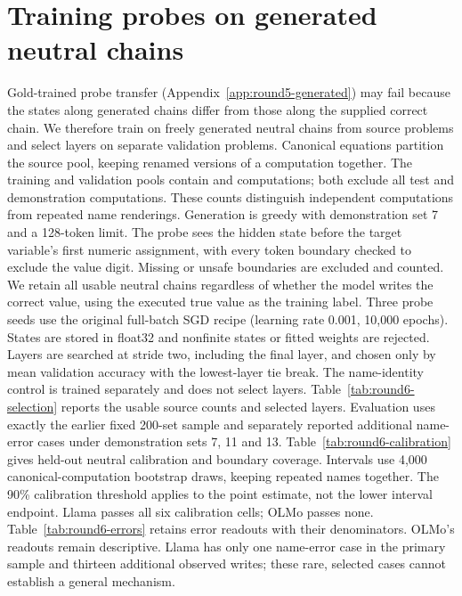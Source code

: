 \newsavebox{\roundsixbox}
\section{Training probes on generated neutral chains}
\label{app:round6-generated}
Gold-trained probe transfer (Appendix~\ref{app:round5-generated}) may fail because the states along generated chains differ from those along the supplied correct chain. We therefore train on freely generated neutral chains from  source problems and select layers on  separate validation problems. Canonical equations partition the source pool, keeping renamed versions of a computation together. The training and validation pools contain  and  computations; both exclude all test and demonstration computations. These counts distinguish independent computations from repeated name renderings.
Generation is greedy with demonstration set 7 and a 128-token limit. The probe sees the hidden state before the target variable's first numeric assignment, with every token boundary checked to exclude the value digit. Missing or unsafe boundaries are excluded and counted. We retain all usable neutral chains regardless of whether the model writes the correct value, using the executed true value as the training label. Three probe seeds use the original full-batch SGD recipe (learning rate 0.001, 10,000 epochs). States are stored in float32 and nonfinite states or fitted weights are rejected. Layers are searched at stride two, including the final layer, and chosen only by mean validation accuracy with the lowest-layer tie break. The name-identity control is trained separately and does not select layers.
Table~\ref{tab:round6-selection} reports the usable source counts and selected layers. Evaluation uses exactly the earlier fixed 200-set sample and separately reported additional name-error cases under demonstration sets 7, 11 and 13. Table~\ref{tab:round6-calibration} gives held-out neutral calibration and boundary coverage. Intervals use 4,000 canonical-computation bootstrap draws, keeping repeated names together. The 90\% calibration threshold applies to the point estimate, not the lower interval endpoint.
Llama passes all six calibration cells; OLMo passes none. Table~\ref{tab:round6-errors} retains error readouts with their denominators. OLMo's readouts remain descriptive. Llama has only one name-error case in the primary sample and thirteen additional observed writes; these rare, selected cases cannot establish a general mechanism.

